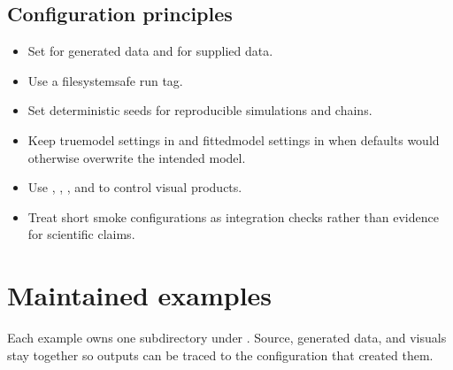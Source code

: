\documentclass[letterpaper,10pt,english]{sphinxmanual}
\begin{document}
\section{Configuration principles}
\label{\detokenize{getting_started:configuration-principles}}\begin{itemize}
\item {}
\sphinxAtStartPar
Set  for generated data and  for
supplied data.

\item {}
\sphinxAtStartPar
Use a filesystem\sphinxhyphen{}safe  run tag.

\item {}
\sphinxAtStartPar
Set deterministic seeds for reproducible simulations and chains.

\item {}
\sphinxAtStartPar
Keep true\sphinxhyphen{}model settings in  and fitted\sphinxhyphen{}model settings in
 when defaults would otherwise overwrite the intended model.

\item {}
\sphinxAtStartPar
Use , , , and
 to control visual products.

\item {}
\sphinxAtStartPar
Treat short smoke configurations as integration checks rather than evidence
for scientific claims.

\end{itemize}

\sphinxstepscope


\chapter{Maintained examples}
\label{\detokenize{examples:maintained-examples}}\label{\detokenize{examples::doc}}
\sphinxAtStartPar
Each example owns one subdirectory under . Source, generated data,
and visuals stay together so outputs can be traced to the configuration that
created them.
\end{document}
